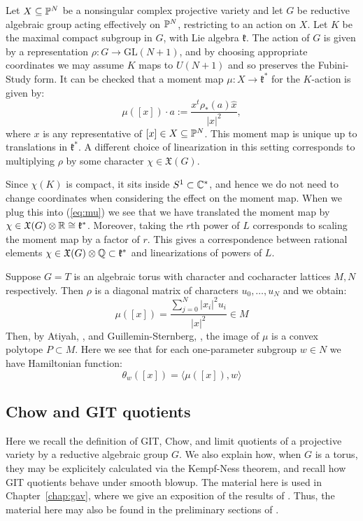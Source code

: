 \begin{example}
Let \(X \subseteq \mathbb{P}^N\) be a nonsingular complex projective variety and let \(G\) be reductive algebraic group acting effectively on \(\mathbb{P}^N\), restricting to an action on \(X\). Let \(K\) be the maximal compact subgroup in \(G\), with Lie algebra \(\mathfrak{k}\). The action of \(G\) is given by a representation \(\rho: G \to \text{GL}(N+1)\), and by choosing appropriate coordinates we may assume \(K\) maps to \(U(N+1)\) and so preserves the Fubini-Study form. It can be checked that a moment map \(\mu: X \to \mathfrak{k}^*\) for the \(K\)-action is given by:
\begin{equation}\label{eq:mu}
\mu([x]) \cdot a := \frac{x^t \rho_*(a) \hat{x}}{ |x|^2},
\end{equation}
where \(x\) is any representative of \([x] \in X \subseteq \mathbb{P}^N\). This moment map is unique up to translations in \(\mathfrak{k}^*\). A different choice of linearization in this setting corresponds to multiplying \(\rho\) by some character \(\chi \in \mathfrak{X}(G)\).

Since \(\chi(K)\) is compact, it sits inside \(S^1 \subset \mathbb{C}^*\), and hence we do not need to change coordinates when considering the effect on the moment map. When we plug this into (\ref{eq:mu}) we see that we have translated the moment map by \(\chi \in \mathfrak{X}(G) \otimes \mathbb{R} \cong \mathfrak{k}^*\). Moreover, taking the \(r\)th power of \(L\) corresponds to scaling the moment map by a factor of \(r\). This gives a correspondence between rational elements \(\chi \in \mathfrak{X}(G) \otimes \mathbb{Q} \subset \mathfrak{k}^*\) and linearizations of powers of \(L\).
\end{example}
\begin{example}
Suppose \(G = T\) is an algebraic torus with character and cocharacter lattices \(M,N\) respectively. Then \(\rho\) is a diagonal matrix of characters \(u_0,\dots,u_{N}\) and we obtain:
\[
\mu([x]) = \frac{\sum_{j=0}^N |x_i|^2 u_i}{|x|^2} \in M
\]
Then, by Atiyah, \cite{atiyah1982convexity}, and Guillemin-Sternberg, \cite{guillemin1982convexity}, the image of \(\mu\) is a convex polytope \(P \subset M\). Here we see that for each one-parameter subgroup \(w \in N\) we have Hamiltonian function:
\[
\theta_w([x]) = \langle \mu([x]), w \rangle  
\]
\end{example}
\subsection{Chow and GIT quotients} \label{basics:Chowquotients}
Here we recall the definition of GIT, Chow, and limit quotients of a projective variety by a reductive algebraic group \(G\). We also explain how, when \(G\) is a torus, they may be explicitely calculated via the Kempf-Ness theorem, and recall how GIT quotients behave under smooth blowup. The material here is used in Chapter~\ref{chap:gav}, where we give an exposition of the results of \cite{cable2019general}. Thus, the material here may also be found in the preliminary sections of \cite{cable2019general}.
